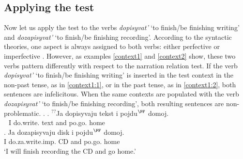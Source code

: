 %
%

\subsection{Applying the test}\label{subsection:bi:apply}
Now let us apply the test to the verbs \textit{dopisyvat'} `to finish/be finishing writing' and \textit{dozapisyvat'} `to finish/be finishing recording'. According to the syntactic theories, one aspect is always assigned to both verbs: either perfective \citep{Ramchand:04, Romanova:04, Svenonius:04b} or imperfective \citep{Tatevosov:07, Tatevosov:09}. However, as examples \ref{context1} and \ref{context2} show, these two verbs pattern differently with respect to the narration relation test. If the verb \textit{dopisyvat'} `to finish/be finishing writing' is inserted in the test context in the non-past tense, as in \ref{context1:1}, or in the past tense, as in \ref{context1:2}, both sentences are infelicitous. When the same contexts are populated with the verb \textit{dozapisyvat'} `to finish/be finishing recording', both resulting sentences are non-problematic.
\ex.\label{context1} \ag. \label{context1:1}$^{??}$Ja dopisyvaju tekst i pojdu$^{\PF}$ domoj.\\
{\textcolor{white}{$^{??}$}}I do.write. text and po.go. home\\
\bg. \label{context2:1}Ja dozapisyvaju disk i pojdu$^{\PF}$ domoj.\\
I do.za.write.imp. CD and po.go. home\\
\vspace{0.5em}
`I will finish recording the CD and go home.'

